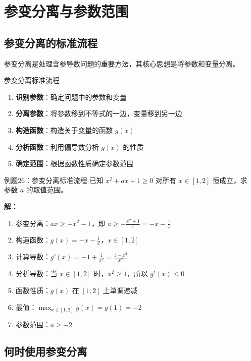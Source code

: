\documentclass[a4paper,11pt]{ctexart}
\theoremstyle{definition}
\theoremstyle{remark}
\begin{document}
\section{参变分离与参数范围}

\subsection{参变分离的标准流程}

参变分离是处理含参导数问题的重要方法，其核心思想是将参数和变量分离。

\begin{methodbox}{参变分离标准流程}
\begin{enumerate}
    \item \textbf{识别参数}：确定问题中的参数和变量
    \item \textbf{分离参数}：将参数移到不等式的一边，变量移到另一边
    \item \textbf{构造函数}：构造关于变量的函数 $g(x)$
    \item \textbf{分析函数}：利用偏导数分析 $g(x)$ 的性质
    \item \textbf{确定范围}：根据函数性质确定参数范围
\end{enumerate}
\end{methodbox}

\begin{examplebox}{例题26：参变分离标准流程}
已知 $x^2 + ax + 1 \geq 0$ 对所有 $x \in [1,2]$ 恒成立，求参数 $a$ 的取值范围。

\textbf{解：}
\begin{enumerate}
    \item 参变分离：$ax \geq -x^2 - 1$，即 $a \geq -\frac{x^2 + 1}{x} = -x - \frac{1}{x}$
    \item 构造函数：$g(x) = -x - \frac{1}{x}$，$x \in [1,2]$
    \item 计算导数：$g'(x) = -1 + \frac{1}{x^2} = \frac{1-x^2}{x^2}$
    \item 分析导数：当 $x \in [1,2]$ 时，$x^2 \geq 1$，所以 $g'(x) \leq 0$
    \item 函数性质：$g(x)$ 在 $[1,2]$ 上单调递减
    \item 最值：$\max_{x \in [1,2]} g(x) = g(1) = -2$
    \item 参数范围：$a \geq -2$
\end{enumerate}
\end{examplebox}

\subsection{何时使用参变分离}
\end{document}
